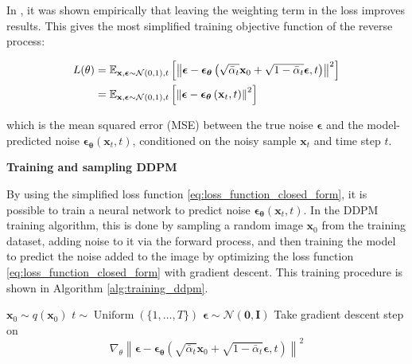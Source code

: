 In \cite{ho2020denoisingdiffusionprobabilisticmodels}, it was shown empirically that leaving the weighting term in the loss improves results. This gives the most simplified training objective function of the reverse process:

\begin{align}
    L(\theta)&=\mathbb{E}_{\mathbf{x}, \boldsymbol{\epsilon} \sim \mathcal{N}(0,1), t}\left[\left\|\boldsymbol{\epsilon}-\boldsymbol{\epsilon}_{\boldsymbol{\theta}}\left(\sqrt{\bar{\alpha}_t} \mathbf{x}_0+\sqrt{1-\bar{\alpha}_t} \boldsymbol{\epsilon}, t\right)\right\|^{2}\right]\notag  \\ 
    &=\mathbb{E}_{\mathbf{x}, \boldsymbol{\epsilon} \sim \mathcal{N}(0,1), t}\left[\left\|\boldsymbol{\epsilon}-\boldsymbol{\epsilon}_{\boldsymbol{\theta}}\left(\mathbf{x}_{t}, t\right)\right\|^{2}\right]
\label{eq:loss_function_closed_form}
\end{align}

which is the mean squared error (MSE) between the true noise $\boldsymbol{\epsilon}$ and the model-predicted noise $\boldsymbol{\epsilon}_{\boldsymbol{\theta}}\left(\mathbf{x}_{t}, t\right)$, conditioned on the noisy sample $\mathbf{x}_{t}$ and time step $t$.

{\textbf{Training and sampling DDPM}}

By using the simplified loss function \ref{eq:loss_function_closed_form}, it is possible to train a neural network to predict noise $\boldsymbol{\epsilon}_{\boldsymbol{\theta}}\left(\mathbf{x}_{t}, t\right)$. In the DDPM training algorithm, this is done by sampling a random image $\mathbf{x}_0$ from the training dataset, adding noise to it via the forward process, and then training the model to predict the noise added to the image by optimizing the loss function \ref{eq:loss_function_closed_form} with gradient descent. This training procedure is shown in Algorithm \ref{alg:training_ddpm}. \cite{ho2020denoisingdiffusionprobabilisticmodels}

\begin{algorithm}[H]
\caption{Training DDPM \cite{ho2020denoisingdiffusionprobabilisticmodels}}
\label{alg:training_ddpm}
\begin{algorithmic}[1]
\Repeat
    \State  $\mathbf{x}_0 \sim q(\mathbf{x}_0)$  
    \State  $t \sim \operatorname{Uniform}(\{1, \ldots, T\})$ 
    \State  $\boldsymbol{\epsilon} \sim \mathcal{N}(\mathbf{0}, \mathbf{I})$ 
    \State Take gradient descent step on 
    \[
    \nabla_\theta \left\| \boldsymbol{\epsilon} - \boldsymbol{\epsilon}_{\boldsymbol{\theta}}\left(\sqrt{\bar{\alpha}_t} \mathbf{x}_0 + \sqrt{1-\bar{\alpha}_t} \boldsymbol{\epsilon}, t\right) \right\|^2
    \] 
\end{algorithmic}
\end{algorithm}

